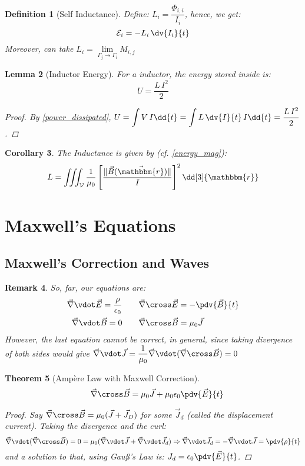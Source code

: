 \documentclass[12pt]{article}
\let\RA\Rightarrow
\renewcommand{\div}{\vec{\nabla}\vdot}
\renewcommand{\curl}{\vec{\nabla}\cross}
\newcommand*{\ir}{\mathbbm{r}}
\newcommand*{\irv}{\vec{\mathbbm{r}}}
\newcommand*{\vE}{\vec{E}}
\newcommand*{\vB}{\vec{B}}
\newcommand*{\vJ}{\vec{J}}
\newcommand*{\ee}{\epsilon_0}
\newcommand*{\mmu}{\mu_0}
\newcommand*{\vol}{\mathcal{V}}
\newtheorem{theorem}{Theorem}[subsection]
\newtheorem{definition}[theorem]{Definition}
\newtheorem{lemma}[theorem]{Lemma}
\newtheorem{corollary}[theorem]{Corollary}
\newtheorem{remark}[theorem]{Remark}
\begin{document}
\begin{definition}[Self Inductance]
  Define: $L_i=\dfrac{\Phi_{i,i}}{I_i}$, hence, we get: $$\mathcal{E}_i=-L_i\,\dv{I_i}{t}$$ Moreover, can take $L_i=\lim\limits_{\Gamma_j\to\Gamma_i}M_{i,j}$
\end{definition}

\begin{lemma}[Inductor Energy]
  For a inductor, the energy stored inside is: $$U=\frac{L\,I^2}{2}$$
  \begin{proof}
    By \ref{power_dissipated}, $\displaystyle U=\int V\,I\dd{t}=\int L\,\dv{I}{t}\,I\dd{t}=\frac{L\,I^2}{2}$.
  \end{proof}
\end{lemma}

\begin{corollary}
  The Inductance is given by (cf. \ref{energy_mag}):
  $$L=\iiint_\vol \frac{1}{\mu_0}\left[\frac{\|\vB(\irv)\|}{I}\right]^2\dd[3]{\ir}$$
\end{corollary}


\pagebreak

\section{Maxwell's Equations}

\subsection{Maxwell's Correction and Waves}

\begin{remark}
  So, far, our equations are:
  \begin{align*}
    \div\vE=\dfrac{\rho}{\ee}\quad&\quad\curl\vE=-\pdv{\vB}{t}\\
    \div\vB=0\quad&\quad\curl\vB=\mmu\vJ
  \end{align*}
  However, the last equation cannot be correct, in general, since taking divergence of both sides would give $\div\vJ=\dfrac{1}{\mmu}\div(\curl\vB)=0$
\end{remark}

\begin{theorem}[Ampère Law with Maxwell Correction]
  $$\quad\curl\vB=\mmu\vJ+\mmu\ee\pdv{\vE}{t}$$
  \begin{proof}
    Say $\curl\vB=\mmu(\vJ+\vJ_D)$ for some $\vJ_d$ (called the displacement current). Taking the divergence and the curl:
    $$\div(\curl\vB)=0=\mmu(\div\vJ+\div\vJ_d)\RA \div\vJ_d=-\div\vJ=\pdv{\rho}{t}$$
    and a solution to that, using Gauß's Law is: $J_d=\displaystyle\ee\pdv{\vE}{t}$.
  \end{proof}
\end{theorem}
\end{document}
